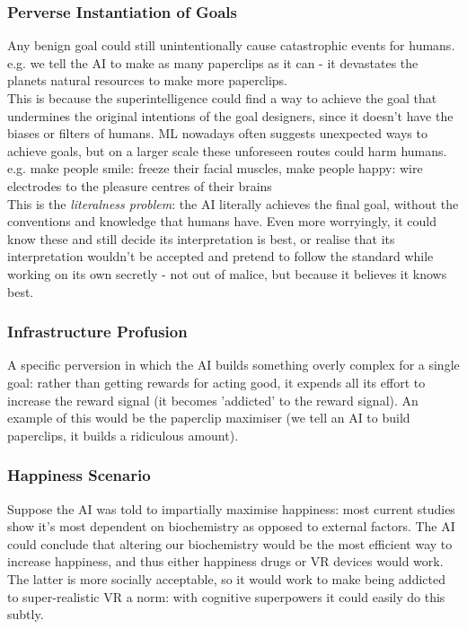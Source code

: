 \subsubsection{Perverse Instantiation of Goals}
Any benign goal could still unintentionally cause catastrophic events for humans. e.g. we tell the AI to make as many paperclips as it can - it devastates the planets natural resources to make more paperclips.\\

This is because the superintelligence could find a way to achieve the goal that undermines the original intentions of the goal designers, since it doesn't have the biases or filters of humans. ML nowadays often suggests unexpected ways to achieve goals, but on a larger scale these unforeseen routes could harm humans. e.g. make people smile: freeze their facial muscles, make people happy: wire electrodes to the pleasure centres of their brains\\

This is the \emph{literalness problem}: the AI literally achieves the final goal, without the conventions and knowledge that humans have. Even more worryingly, it could know these and still decide its interpretation is best, or realise that its interpretation wouldn't be accepted and pretend to follow the standard while working on its own secretly - not out of malice, but because it believes it knows best.

\subsubsection{Infrastructure Profusion}
A specific perversion in which the AI builds something overly complex for a single goal: rather than getting rewards for acting good, it expends all its effort to increase the reward signal (it becomes 'addicted' to the reward signal). An example of this would be the paperclip maximiser (we tell an AI to build paperclips, it builds a ridiculous amount).

\subsubsection{Happiness Scenario}
Suppose the AI was told to impartially maximise happiness: most current studies show it's most dependent on biochemistry as opposed to external factors. The AI could conclude that altering our biochemistry would be the most efficient way to increase happiness, and thus either happiness drugs or VR devices would work. The latter is more socially acceptable, so it would work to make being addicted to super-realistic VR a norm: with cognitive superpowers it could easily do this subtly. \\

